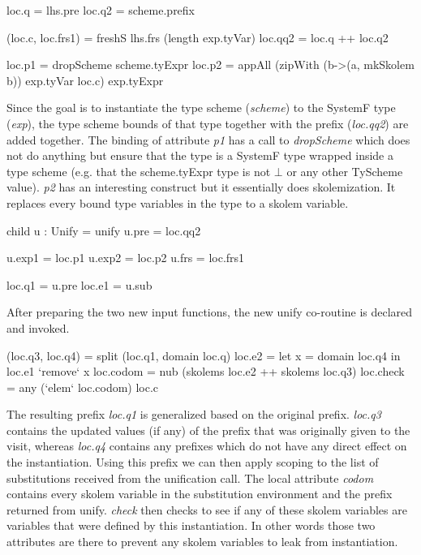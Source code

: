 \begin{code}
   loc.q  = lhs.pre
   loc.q2 = scheme.prefix
   
   (loc.c, loc.frs1) = freshS lhs.frs (length exp.tyVar)
   loc.qq2 = loc.q ++ loc.q2
   
   loc.p1 = dropScheme scheme.tyExpr
   loc.p2 = appAll (zipWith (\a b->(a, mkSkolem b)) exp.tyVar loc.c) exp.tyExpr
\end{code}
Since the goal is to instantiate the type scheme (\emph{scheme}) to the SystemF type (\emph{exp}), the type scheme bounds of that type together with the prefix (\emph{loc.qq2}) are added together. 
The binding of attribute \emph{p1} has a call to \emph{dropScheme} which does not do anything but ensure that the type is a SystemF type wrapped inside a type scheme (e.g. that the scheme.tyExpr type is not $\bot$ or any other TyScheme value). \emph{p2} has an interesting construct but it essentially does skolemization. It replaces every bound type variables in the type to a skolem variable.

\begin{code}
   child u : Unify = unify
   u.pre  = loc.qq2
   
   u.exp1 = loc.p1
   u.exp2 = loc.p2
   u.frs  = loc.frs1
   
   loc.q1 = u.pre
   loc.e1 = u.sub
\end{code}
After preparing the two new input functions, the new unify co-routine is declared and invoked.

\begin{code}
   
   (loc.q3, loc.q4) = split (loc.q1, domain loc.q)
   loc.e2 = let x = domain loc.q4
            in loc.e1 `remove` x
   loc.codom = nub (skolems loc.e2 ++ skolems loc.q3)
   loc.check = any (`elem` loc.codom) loc.c
\end{code}
The resulting prefix \emph{loc.q1} is generalized based on the original prefix. \emph{loc.q3} contains the updated values (if any) of the prefix that was  originally given to the visit, whereas \emph{loc.q4} contains any prefixes which do not have any direct effect on the instantiation. Using this prefix we can then apply scoping to the list of substitutions received from the unification call.
The local attribute \emph{codom} contains every skolem variable in the substitution environment and the prefix returned from unify. \emph{check} then checks to see if any of these skolem variables are variables that were defined by this instantiation. In other words those two attributes are there to prevent any skolem variables to leak from instantiation.

